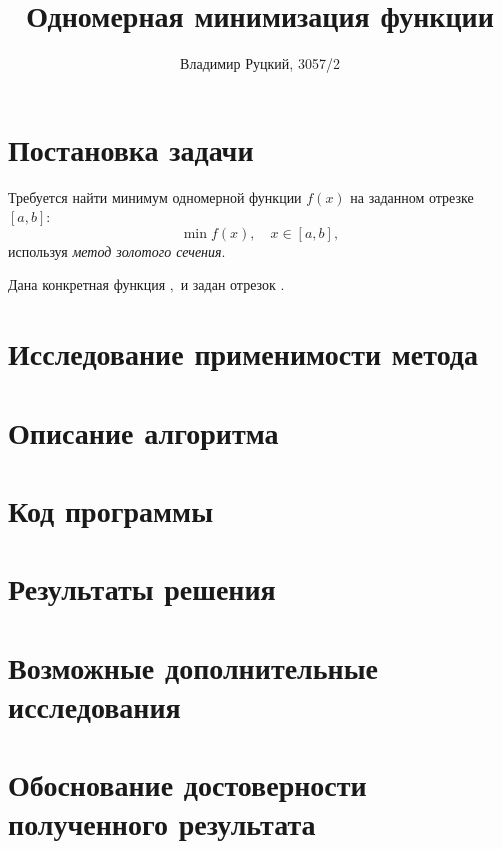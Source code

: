 \documentclass[10pt,a4paper,titlepage]{article}
\title{Одномерная минимизация функции}
\author{Владимир Руцкий, 3057/2}
\begin{document}
\maketitle
\thispagestyle{empty}

\section{Постановка задачи}
Требуется найти минимум одномерной функции $f(x)$ на заданном отрезке $[a, b]$:
$$ \min f(x), \quad x \in [a, b], $$
используя \textit{метод золотого сечения}.

Дана конкретная функция $,$ и задан отрезок $.$

\section{Исследование применимости метода}
\section{Описание алгоритма}
\section{Код программы}
\section{Результаты решения}
\section{Возможные дополнительные исследования}
\section{Обоснование достоверности полученного результата}
\end{document}
